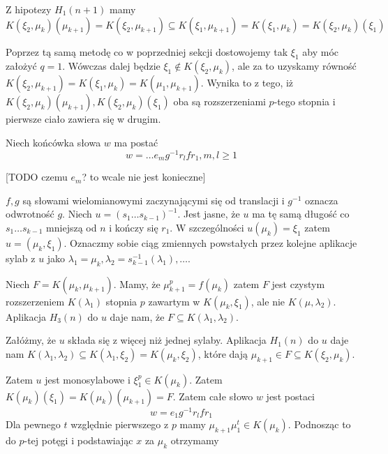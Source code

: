 Z hipotezy $H_1(n+1)$ mamy
\[ 
  K\left(\xi_2, \mu_k\right) \left(\mu_{k+1}\right)
  =
  K\left(\xi_2, \mu_{k+1}\right)
  \subseteq
  K\left(\xi_1, \mu_{k+1}\right)
  =
  K\left(\xi_1, \mu_{k}\right)
  =
  K\left(\xi_2, \mu_{k}\right)\left(\xi_1\right)
\]

Poprzez tą samą metodę co w poprzedniej sekcji dostowojemy tak $\xi_1$ aby móc
założyć $q = 1$. Wówczas dalej będzie $\xi_1 \not \in K\left(\xi_2,
\mu_k\right)$, ale za to uzyskamy równość 
$K\left(\xi_2, \mu_{k+1}\right) 
= K\left(\xi_1, \mu_k\right) 
= K\left(\mu_1, \mu_{k+1}\right)$. Wynika to z tego, iż 
$
K\left(\xi_2, \mu_{k}\right) \left(\mu_{k+1}\right),
K\left(\xi_2, \mu_{k}\right) \left(\xi_{1}\right)$ oba są rozszerzeniami
$p$-tego stopnia i pierwsze ciało zawiera się w drugim.

Niech końcówka słowa $w$ ma postać
\[ w = \ldots e_mg^{-1}r_lfr_1, m,l \geq 1\]

[TODO czemu $e_m$? to wcale nie jest konieczne]

$f, g$ są słowami wielomianowymi zaczynającymi się od translacji i $g^{-1}$
oznacza odwrotność $g$. Niech $u = \left(s_1 \ldots s_{k-1}\right)^{-1}$. Jest
jasne, że $u$ ma tę samą długość co $s_1\ldots s_{k-1}$ mniejszą od $n$ i kończy
się $r_1$. W szczególności $u\left(\mu_k\right) = \xi_1$ zatem $u = \left(\mu_k,
\xi_1\right)$. Oznaczmy sobie ciąg zmiennych powstałych przez kolejne aplikacje
sylab z $u$ jako $\lambda_1 = \mu_k, \lambda_2 =
s_{k-1}^{-1}\left(\lambda_1\right), \ldots$.

Niech $F = K \left(\mu_k, \mu_{k+1}\right)$. Mamy, że 
$\mu_{k+1}^p = f\left(\mu_k\right)$ zatem $F$ jest czystym rozszerzeniem
$K\left(\lambda_1 \right)$ stopnia $p$ zawartym w $K \left( \mu_k, \xi_1
\right)$, ale nie $K \left(\mu, \lambda_2 \right)$. 
Aplikacja $H_3(n)$ do $u$ daje nam, że $F \subseteq K \left( \lambda_1,
\lambda_2 \right)$.

Załóżmy, że $u$ składa się z więcej niż jednej sylaby. Aplikacja $H_1(n)$ do $u$
daje nam 
$K \left( \lambda_1, \lambda_2 \right) \subseteq K \left( \lambda_1, \xi_2
\right) = K \left( \mu_k, \xi_2 \right)$, które dają $\mu_{k+1} \in F \subseteq
K \left( \xi_2, \mu_k \right)$.

Zatem $u$ jest monosylabowe i $\xi_1^p \in K \left( \mu_k\right)$. Zatem 
$K \left( \mu_k \right) \left(\xi_1 \right) = K \left(\mu_k \right)
\left(\mu_{k+1} \right) = F$. Zatem całe słowo $w$ jest postaci
\[w = e_1 g^{-1}r_lfr_1\]
Dla pewnego $t$ względnie pierwszego z $p$ mamy $\mu_{k+1} \mu_1^t \in K \left(
\mu_k \right)$.  Podnosząc to do $p$-tej potęgi i podstawiając $x$ za $\mu_k$
otrzymamy

